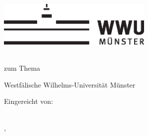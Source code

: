 \thispagestyle{empty}

\begin{center}
    \includegraphics[width=7.5cm]{logos/wwu-logo.eps}
    \par
    \vspace*{8ex}
    \LARGE
    \printtitle
    \par
    \normalsize
    \vspace*{8ex}
    \large
    \textsc{\printtype}\\
    \normalsize
    zum Thema\\
    \large
    \textsc{\printdegree}
    \par
    \normalsize
    \vspace*{6ex}
    Westfälische Wilhelms-Universität Münster\\
    \printinstitute
\end{center}

%
%

\vspace*{5cm}
\par
\normalsize
\vspace*{2ex}
Eingereicht von:\\
\large
\textit{\printname}\\

\par
\normalsize
\vspace*{4ex}
\printcity, \makeatletter
\monthname
\makeatother~\the\year
